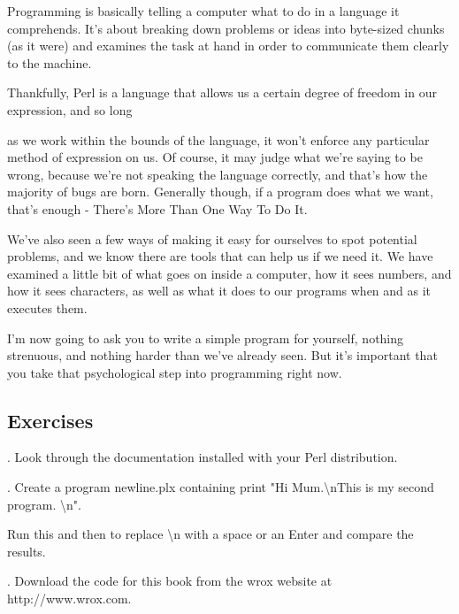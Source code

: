 \documentclass[a4paper,12pt,twoside]{book}
\begin{document}
\noindent Programming is basically telling a computer what to do in a language it comprehends. It's about breaking down problems or ideas into byte-sized chunks (as it were) and examines the task at hand in order to communicate them clearly to the machine.

\noindent 

\noindent Thankfully, Perl is a language that allows us a certain degree of freedom in our expression, and so long

\noindent as we work within the bounds of the language, it won't enforce any particular method of expression on us. Of course, it may judge what we're saying to be wrong, because we're not speaking the language correctly, and that's how the majority of bugs are born. Generally though, if a program does what we want, that's enough - There's More Than One Way To Do It.

\noindent 

\noindent We've also seen a few ways of making it easy for ourselves to spot potential problems, and we know there are tools that can help us if we need it. We have examined a little bit of what goes on inside a computer, how it sees numbers, and how it sees characters, as well as what it does to our programs when and as it executes them.

\noindent 

\noindent I'm now going to ask you to write a simple program for yourself, nothing strenuous, and nothing harder than we've already seen. But it's important that you take that psychological step into programming right now.

\noindent 

\subsection{Exercises}

\noindent 

.  Look through the documentation installed with your Perl distribution.

\noindent 

.  Create a program newline.plx containing print "Hi Mum.\textbackslash nThis is my second program. \textbackslash n".

\noindent Run this and then to replace \textbackslash n with a space or an Enter and compare the results.

\noindent 

.  Download the code for this book from the wrox website at http://www.wrox.com.
\end{document}
